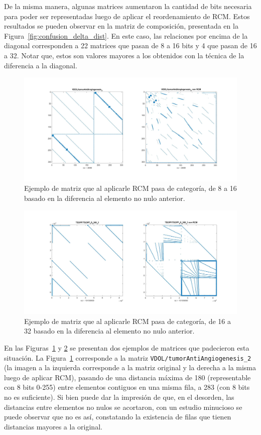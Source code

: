 De la misma manera, algunas matrices aumentaron la cantidad de bits necesaria para  poder ser representadas luego de aplicar el reordenamiento de RCM. Estos resultados  se pueden observar en la matriz de composición, presentada en la Figura~\ref{fig:confusion_delta_dist}. En este caso, las relaciones por encima de la diagonal corresponden a 22 matrices que pasan de 8 a 16 bits y 4 que pasan de 16 a 32. Notar que, estos son valores mayores a los obtenidos con la técnica de la diferencia a la diagonal. %
\begin{figure}
    \centering
    \includegraphics[width=.7\textwidth]{imagenes/chap4/spy_delta_8_to_16.jpg}
    \caption{Ejemplo de matriz que al aplicarle RCM pasa de categoría, de 8 a 16 basado en la diferencia al elemento no nulo anterior.}
    \label{fig:spy_delta_8_to_16}
\end{figure}
\begin{figure}
    \centering
    \includegraphics[width=.7\textwidth]{imagenes/chap4/spy_delta_16_to_32.jpg}
    \caption{Ejemplo de matriz que al aplicarle RCM pasa de categoría, de 16 a 32 basado en la diferencia al elemento no nulo anterior.}
    \label{fig:spy_delta_16_to_32}
\end{figure}
En las Figuras~\ref{fig:spy_delta_8_to_16} y \ref{fig:spy_delta_16_to_32} se presentan dos ejemplos de matrices que padecieron esta situación. La Figura~\ref{fig:spy_delta_8_to_16} corresponde a la matriz \texttt{VDOL/tumorAntiAngiogenesis\_2} (la imagen a la izquierda corresponde a la matriz original y la derecha a la misma luego de aplicar RCM), pasando de una distancia máxima de 180 (representable con 8 bits 0-255) entre elementos contiguos en una misma fila, a 283 (con 8 bits no es suficiente). Si bien puede dar la impresión de que, en el desorden, las distancias entre elementos no nulos se acortaron, con un estudio minucioso se  puede observar que no es así, constatando la existencia de filas que tienen distancias mayores a la original.

